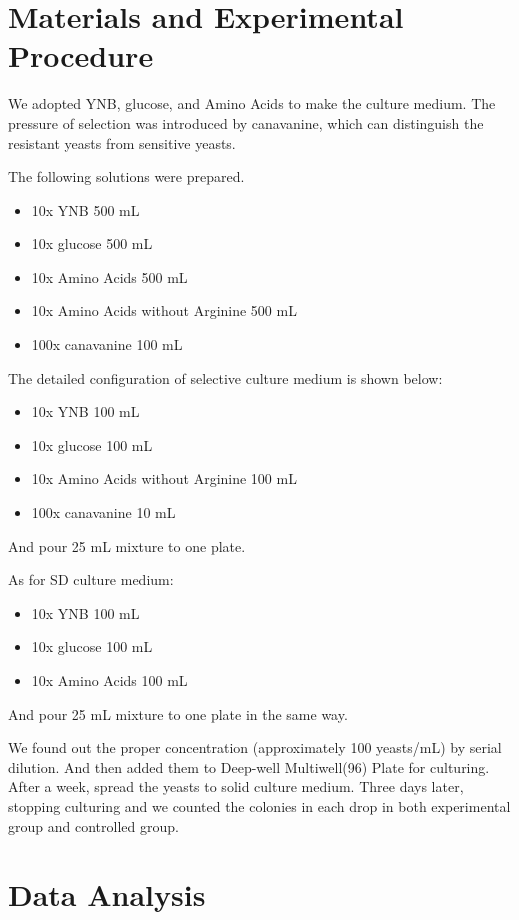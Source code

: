 \documentclass[UTF-8]{article}
\begin{document}
\section{Materials and Experimental Procedure}
We adopted YNB, glucose, and Amino Acids to make the culture medium.
The pressure of selection was introduced by canavanine, which can distinguish the resistant yeasts from sensitive yeasts.

The following solutions were prepared.
\begin{itemize}
    \item 10x YNB 500 mL 
    \item 10x glucose 500 mL
    \item 10x Amino Acids 500 mL
    \item 10x Amino Acids without Arginine 500 mL
    \item 100x canavanine 100 mL
\end{itemize}

The detailed configuration of selective culture medium is shown below:
\begin{itemize}
    \item 10x YNB 100 mL 
    \item 10x glucose 100 mL
    \item 10x Amino Acids without Arginine 100 mL
    \item 100x canavanine 10 mL
\end{itemize}

And pour 25 mL mixture to one plate.

As for SD culture medium:
\begin{itemize}
    \item 10x YNB 100 mL 
    \item 10x glucose 100 mL
    \item 10x Amino Acids 100 mL
\end{itemize}

And pour 25 mL mixture to one plate in the same way.

We found out the proper concentration (approximately 100 yeasts/mL) by serial dilution.
And then added them to Deep-well Multiwell(96) Plate for culturing. After a week, spread the yeasts to solid culture medium. Three days later, stopping culturing and we counted the colonies in each drop in both experimental group and controlled group.

\section{Data Analysis}
\end{document}
